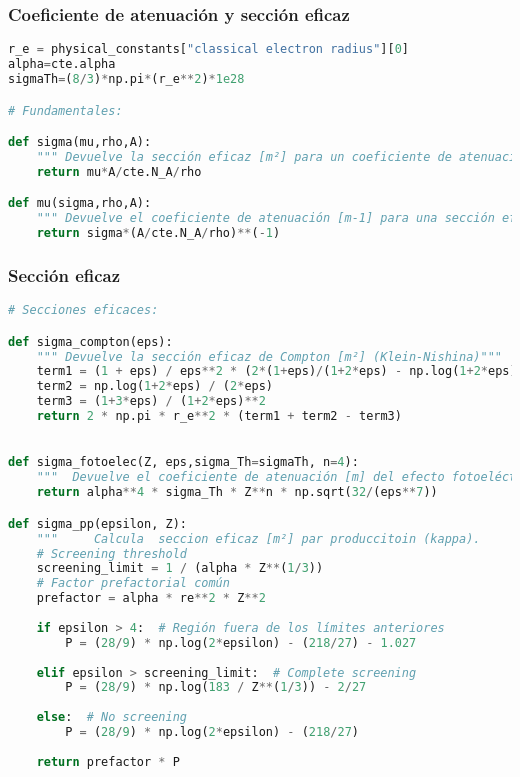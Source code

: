 \subsubsection{Coeficiente de atenuación y sección eficaz}
\begin{lstlisting}[language=python]
r_e = physical_constants["classical electron radius"][0]
alpha=cte.alpha
sigmaTh=(8/3)*np.pi*(r_e**2)*1e28

# Fundamentales: 

def sigma(mu,rho,A): 
    """ Devuelve la sección eficaz [m²] para un coeficiente de atenuación, densidad y número másico"""
    return mu*A/cte.N_A/rho

def mu(sigma,rho,A): 
    """ Devuelve el coeficiente de atenuación [m-1] para una sección eficaz [m²], densidad y número másico"""
    return sigma*(A/cte.N_A/rho)**(-1)
\end{lstlisting}
\subsubsection{Sección eficaz}
\begin{lstlisting}[language=python]
# Secciones eficaces: 

def sigma_compton(eps):
    """ Devuelve la sección eficaz de Compton [m²] (Klein-Nishina)"""
    term1 = (1 + eps) / eps**2 * (2*(1+eps)/(1+2*eps) - np.log(1+2*eps)/eps)
    term2 = np.log(1+2*eps) / (2*eps)
    term3 = (1+3*eps) / (1+2*eps)**2
    return 2 * np.pi * r_e**2 * (term1 + term2 - term3)
    

def sigma_fotoelec(Z, eps,sigma_Th=sigmaTh, n=4):
    """  Devuelve el coeficiente de atenuación [m] del efecto fotoeléctrico. """
    return alpha**4 * sigma_Th * Z**n * np.sqrt(32/(eps**7))

def sigma_pp(epsilon, Z):
    """     Calcula  seccion eficaz [m²] par produccitoin (kappa).     """
    # Screening threshold
    screening_limit = 1 / (alpha * Z**(1/3))
    # Factor prefactorial común
    prefactor = alpha * re**2 * Z**2
    
    if epsilon > 4:  # Región fuera de los límites anteriores
        P = (28/9) * np.log(2*epsilon) - (218/27) - 1.027
    
    elif epsilon > screening_limit:  # Complete screening
        P = (28/9) * np.log(183 / Z**(1/3)) - 2/27
    
    else:  # No screening
        P = (28/9) * np.log(2*epsilon) - (218/27)
    
    return prefactor * P
\end{lstlisting}
